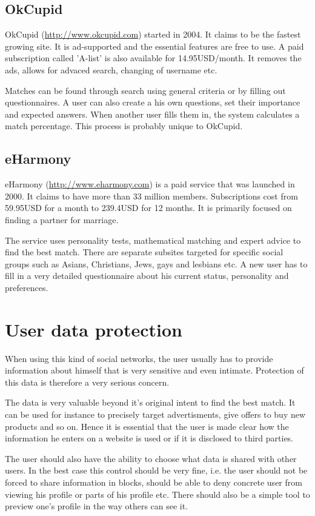 \documentclass[12pt,oneside]{fithesis}
\begin{document}
		\subsection{OkCupid}
		OkCupid (\url{http://www.okcupid.com}) started in 2004. It claims to be the fastest growing site.
		It is ad-supported and the essential features are free to use. A paid subscription called 'A-list' is also available for 14.95USD/month. It removes the ads, allows for advaced search, changing of username etc.
		
		Matches can be found through search using general criteria or by filling out questionnaires. A user can also create a his own questions, set their importance and expected answers. When another user fills them in, the system calculates a match percentage. This process is probably unique to OkCupid.\cite{website:okcupid}
		\subsection{eHarmony}
		eHarmony (\url{http://www.eharmony.com}) is a paid service that was launched in 2000. It claims to have more than 33 million members. Subscriptions cost from 59.95USD for a month  to 239.4USD for 12 months. It is primarily focused on finding a partner for marriage.
		
		The service uses personality tests, mathematical matching and expert advice to find the best match. There are separate subsites targeted for specific social groups such as Asians, Christians, Jews, gays and  lesbians etc. A new user has to fill in a very detailed questionnaire about his current status, personality and preferences.\cite{website:eharmony}
\section{User data protection}
	When using this kind of social networks, the user usually has to provide information about himself that is very sensitive and even intimate. Protection of this data is therefore a very serious concern.
	
	The data is very valuable beyond it's original intent to find the best match. It can be used for instance to precisely target advertisments, give offers to buy new products and so on. Hence it is essential that the user is made clear how the information he enters on a website is used or if it is disclosed to third parties.
	
	The user should also have the ability to choose what data is shared with other users. In the best case this control should be very fine, i.e. the user should not be forced to share information in blocks, should be able to deny concrete user from viewing his profile or parts of his profile etc. There should also be a simple tool to preview one's profile in the way others can see it.
	
\end{document}
